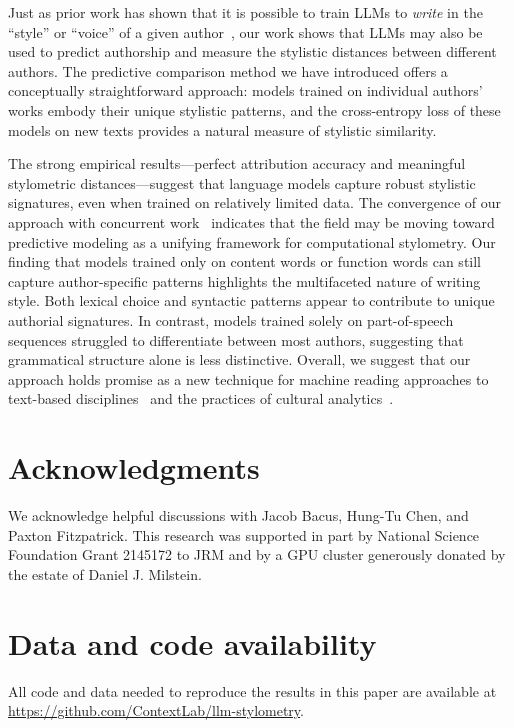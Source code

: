 \documentclass{llmxive}
\begin{document}
Just as prior work has shown that it is possible to train LLMs to
\textit{write} in the ``style'' or ``voice'' of a given author~\citep[see
e.g.,][]{Mikr25}, our work shows that LLMs may also be used to predict
authorship and measure the stylistic distances between different authors. The
predictive comparison method we have introduced offers a conceptually
straightforward approach: models trained on individual authors' works embody
their unique stylistic patterns, and the cross-entropy loss of these models on
new texts provides a natural measure of stylistic similarity.

The strong empirical results---perfect attribution accuracy and meaningful
stylometric distances---suggest that language models capture robust stylistic
signatures, even when trained on relatively limited data. The convergence of
our approach with concurrent work~\citep{HuanEtal25,Reza25} indicates that the
field may be moving toward predictive modeling as a unifying framework for
computational stylometry. Our finding that models trained only on content words
or function words can still capture author-specific patterns highlights the
multifaceted nature of writing style. Both lexical choice and syntactic
patterns appear to contribute to unique authorial signatures. In contrast,
models trained solely on part-of-speech sequences struggled to differentiate
between most authors, suggesting that grammatical structure alone is less
distinctive. Overall, we suggest that our approach holds promise as a new
technique for machine reading approaches to text-based
disciplines~\citep{More17,More00,Holm98} and the practices of cultural
analytics~\citep{UndeEtal13}.

\section*{Acknowledgments}

We acknowledge helpful discussions with Jacob Bacus, Hung-Tu Chen, and Paxton
Fitzpatrick. This research was supported in part by National Science Foundation
Grant 2145172 to JRM and by a GPU cluster generously donated by the estate of
Daniel J. Milstein.

\section*{Data and code availability}

All code and data needed to reproduce the results in this paper are available
at \url{https://github.com/ContextLab/llm-stylometry}.
\end{document}

